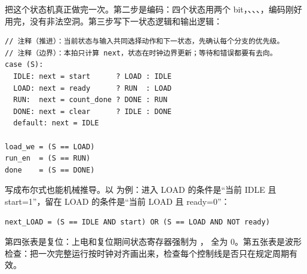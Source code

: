 把这个状态机真正做完一次。第二步是编码：四个状态用两个 bit，、、、，编码刚好用完，没有非法空洞。第三步写下一状态逻辑和输出逻辑：

\begin{lstlisting}
// 注释（推进）：当前状态与输入共同选择动作和下一状态，先确认每个分支的优先级。
// 注释（边界）：本拍只计算 next，状态在时钟边界更新；等待和错误都要有去向。
case (S):
  IDLE: next = start      ? LOAD : IDLE
  LOAD: next = ready      ? RUN  : LOAD
  RUN:  next = count_done ? DONE : RUN
  DONE: next = clear      ? IDLE : DONE
  default: next = IDLE

load_we = (S == LOAD)
run_en  = (S == RUN)
done    = (S == DONE)
\end{lstlisting}

写成布尔式也能机械推导。以  为例：进入 LOAD 的条件是“当前 IDLE 且 start=1”，留在 LOAD 的条件是“当前 LOAD 且 ready=0”：

\begin{lstlisting}
next_LOAD = (S == IDLE AND start) OR (S == LOAD AND NOT ready)
\end{lstlisting}

第四张表是复位：上电和复位期间状态寄存器强制为 ， 全为 0。第五张表是波形检查：把一次完整运行按时钟对齐画出来，检查每个控制线是否只在规定周期有效。

